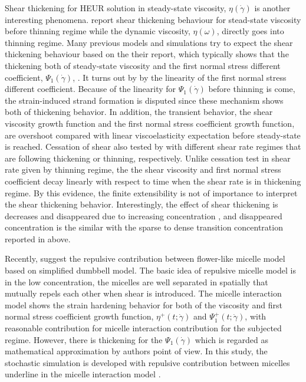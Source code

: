 \documentclass[10pt, a4paper]{article}
\begin{document}
Shear thickening for HEUR solution in steady-state viscosity, $\eta(\dot{\gamma})$ is another interesting phenomena. \textcite{Annable:1993jd} report shear thickening behaviour for stead-state viscosity before thinning regime while the dynamic viscosity, $\eta(\omega)$, directly goes into thinning regime. Many previous models and simulations try to expect the shear thickening behaviour based on the their report, which typically shows that the thickening both of steady-state viscosity and the first normal stress different coefficient, $\Psi_1(\dot{\gamma})$, \parencites{Tam:1998fi, HernandezCifre:2003jza, HernandezCifre:2007cb, VandenBrule:1995ul, Koga:2010cc}. It turns out by \textcite{Pellens:2004ga, Suzuki:2012gfa} by the linearity of the first normal stress different coefficient. Because of the linearity for $\Psi_1(\dot{\gamma})$ before thinning is come, the strain-induced strand formation is disputed since these mechanism shows both of thickening behavior. In addition, the transient behavior, the shear viscosity growth function and the first normal stress coefficient growth function, are overshoot compared with linear viscoelasticity expectation before steady-state is reached. Cessation of shear also tested by \textcite{Suzuki:2012gfa} with different shear rate regimes that are following thickening or thinning, respectively. Unlike cessation test in shear rate given by thinning regime, the the shear viscosity and first normal stress coefficient decay linearly with respect to time when the shear rate is in thickening regime. By this evidence, the finite extensibility is not of importance to interpret the shear thickening behavior. Interestingly, the effect of shear thickening is decreases and disappeared due to increasing concentration \parencite{Suzuki:2013kk}, and disappeared concentration is the similar with the sparse to dense transition concentration reported in above.  

Recently, \textcite{Ianniruberto:2015dv} suggest the repulsive contribution between flower-like micelle model based on simplified dumbbell model. The basic idea of repulsive micelle model is in the low concentration, the micelles are well separated in spatially that mutually repels each other when shear is introduced. The micelle interaction model shows the strain hardening behavior for both of the viscosity and first normal stress coefficient growth function, $\eta^{+}(t;\dot{\gamma})$ and $\Psi_1^{+}(t;\dot{\gamma})$, with reasonable contribution for micelle interaction contribution for the subjected regime. However, there is thickening for the $\Psi_1(\dot{\gamma})$ which is regarded as mathematical approximation by authors point of view. In this study, the stochastic simulation is developed with repulsive contribution between micelles underline in the micelle interaction model \parencite{Ianniruberto:2015dv}.
\end{document}
